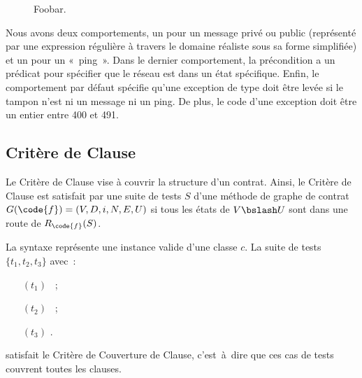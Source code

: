 \begin{figure}


\caption{Foobar.}

\end{figure}
%
Nous avons deux comportements, un pour un message privé ou public (représenté
par une expression régulière à travers le domaine réaliste  sous sa
forme simplifiée) et un pour un «~ping~». Dans le dernier comportement, la
précondition a un prédicat pour spécifier que le réseau est dans un état
spécifique. Enfin, le comportement par défaut spécifie qu'une exception de type
 doit être levée
si le tampon n'est ni un message ni un ping. De plus, le code d'une exception
doit être un entier entre 400 et 491.

\subsection{Critère de Clause}

Le Critère de Clause vise à couvrir la structure d'un contrat. Ainsi, le Critère
de Clause est satisfait par une suite de tests $S$ d'une méthode  de
graphe de contrat $G(\code{f}) = (V, D, i, N, E, U)$ si tous les états de $V
\bslash U$ sont dans une route de $R_\code{f}(S)$.

\begin{example}

La syntaxe  représente une instance valide d'une classe $c$.
La suite de tests $\{t_1, t_2, t_3\}$ avec~:
%
\begin{itemize}

\item[$(t_1)$] ~;

\item[$(t_2)$] ~;

\item[$(t_3)$] .

\end{itemize}
%
satisfait le Critère de Couverture de Clause, c'est~à~dire que ces cas de tests
couvrent toutes les clauses.

\end{example}

